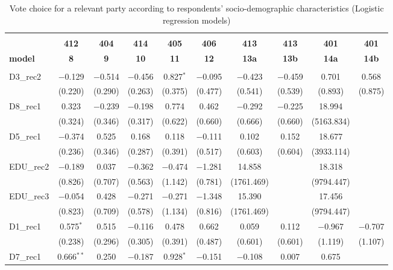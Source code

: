\documentclass[
]{article}
\begin{document}
\begin{table}[!htbp] \centering 
  \caption{Vote choice for a relevant party according to respondents' 
                       socio-demographic characteristics (Logistic regression models)} 
  \label{table:full_logit_hr} 
\begin{tabular}{@{\extracolsep{5pt}}lccccccccc} 
\\[-1.8ex]\hline \\[-1.8ex] 
 & \textbf{412} & \textbf{404} & \textbf{414} & \textbf{405} & \textbf{406} & \textbf{413} & \textbf{413} & \textbf{401} & \textbf{401} \\ 
\textbf{model} & \textbf{8} & \textbf{9} & \textbf{10} & \textbf{11} & \textbf{12} & \textbf{13a} & \textbf{13b} & \textbf{14a} & \textbf{14b}\\ 
\hline \\[-1.8ex] 
 D3\_rec2 & $-$0.129 & $-$0.514 & $-$0.456 & 0.827$^{*}$ & $-$0.095 & $-$0.423 & $-$0.459 & 0.701 & 0.568 \\ 
  & (0.220) & (0.290) & (0.263) & (0.375) & (0.477) & (0.541) & (0.539) & (0.893) & (0.875) \\ 
  D8\_rec1 & 0.323 & $-$0.239 & $-$0.198 & 0.774 & 0.462 & $-$0.292 & $-$0.225 & 18.994 &  \\ 
  & (0.324) & (0.346) & (0.317) & (0.622) & (0.660) & (0.666) & (0.660) & (5163.834) &  \\ 
  D5\_rec1 & $-$0.374 & 0.525 & 0.168 & 0.118 & $-$0.111 & 0.102 & 0.152 & 18.677 &  \\ 
  & (0.236) & (0.346) & (0.287) & (0.391) & (0.517) & (0.603) & (0.604) & (3933.114) &  \\ 
  EDU\_rec2 & $-$0.189 & 0.037 & $-$0.362 & $-$0.474 & $-$1.281 & 14.858 &  & 18.318 &  \\ 
  & (0.826) & (0.707) & (0.563) & (1.142) & (0.781) & (1761.469) &  & (9794.447) &  \\ 
  EDU\_rec3 & $-$0.054 & 0.428 & $-$0.271 & $-$0.271 & $-$1.348 & 15.390 &  & 17.456 &  \\ 
  & (0.823) & (0.709) & (0.578) & (1.134) & (0.816) & (1761.469) &  & (9794.447) &  \\ 
  D1\_rec1 & 0.575$^{*}$ & 0.515 & $-$0.116 & 0.478 & 0.662 & 0.059 & 0.112 & $-$0.967 & $-$0.707 \\ 
  & (0.238) & (0.296) & (0.305) & (0.391) & (0.487) & (0.601) & (0.601) & (1.119) & (1.107) \\ 
  D7\_rec1 & 0.666$^{**}$ & 0.250 & $-$0.187 & 0.928$^{*}$ & $-$0.151 & $-$0.108 & 0.007 & 0.675 &  \\ 

\end{tabular}
\end{table}
\end{document}
